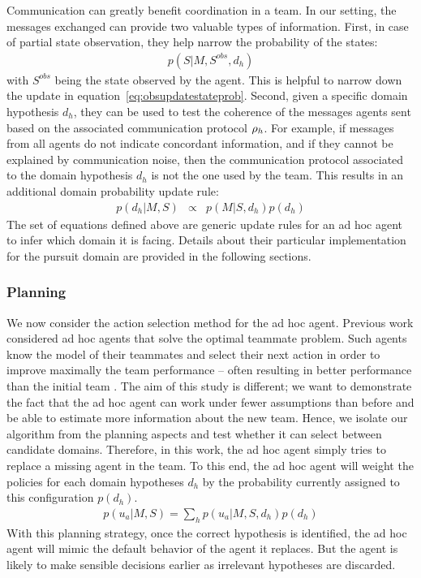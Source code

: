 Communication can greatly benefit coordination in a team. In our setting, the messages exchanged can provide two valuable types of information. First, in case of partial state observation, they help narrow the probability of the states:
%
\begin{eqnarray}
p(S|M, S^{obs}, d_h)
\label{eq:stateupdate}
\end{eqnarray}
%
with $S^{obs}$ being the state observed by the agent. This is helpful to narrow down the update in equation~\ref{eq:obsupdatestateprob}. Second, given a specific domain hypothesis $d_h$, they can be used to test the coherence of the messages agents sent based on the associated communication protocol $\rho_h$. For example, if messages from all agents do not indicate concordant information, and if they cannot be explained by communication noise, then the communication protocol associated to the domain hypothesis $d_h$ is not the one used by the team. This results in an additional domain probability update rule:
%
\begin{eqnarray}
p(d_h|M,S) &\propto& p(M|S,d_h) p(d_h)
\label{eq:messageupdate}
\end{eqnarray}
%
The set of equations defined above are generic update rules for an ad hoc agent to infer which domain it is facing. Details about their particular implementation for the pursuit domain are provided in the following sections.

\subsubsection{Planning}

We now consider the action selection method for the ad hoc agent. Previous work considered ad hoc agents that solve the optimal teammate problem. Such agents know the model of their teammates and select their next action in order to improve maximally the team performance -- often resulting in better performance than the initial team \cite{barrett2011empirical}. The aim of this study is different; we want to demonstrate the fact that the ad hoc agent can work under fewer assumptions than before and be able to estimate more information about the new team. Hence, we isolate our algorithm from the planning aspects and test whether it can select between candidate domains. Therefore, in this work, the ad hoc agent simply tries to replace a missing agent in the team. To this end, the ad hoc agent will weight the policies for each domain hypotheses $d_h$ by the probability currently assigned to this configuration $p(d_h)$.
%
\begin{eqnarray}
p(u_a|M, S) = \sum_h p(u_a|M, S, d_h) p(d_h)
\label{eq:adhocpolicy}
\end{eqnarray}
%
With this planning strategy, once the correct hypothesis is identified, the ad hoc agent will mimic the default behavior of the agent it replaces. But the agent is likely to make sensible decisions earlier as irrelevant hypotheses are discarded.

